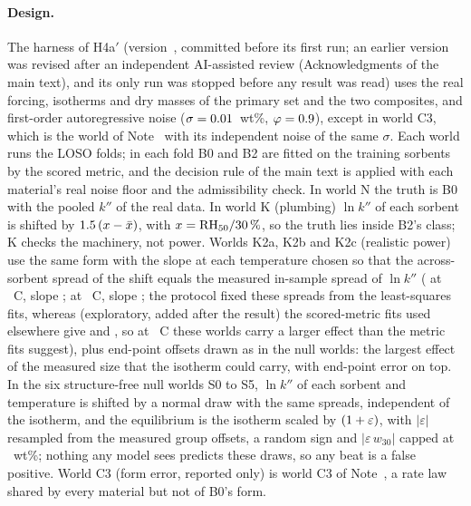 \documentclass[11pt]{article}
\newcommand{\kpp}{k''}
\begin{document}
\paragraph{Design.} The harness of H4a$'$ (version~, committed before its first run; an earlier version was
revised after an independent AI-assisted review (Acknowledgments of the main text), and its only run was stopped before any result was read) uses the real forcing,
isotherms and dry masses of the primary set and the two composites, and first-order autoregressive
noise ($\sigma = \V{si2_sig}{0.01}$~wt\%, $\varphi = \V{si2_phi}{0.9}$), except in world C3, which is the world of
Note~ with its independent noise of the same $\sigma$. Each world runs the  LOSO folds; in each fold B0 and B2 are fitted on the training
sorbents by the scored metric, and the decision rule of the main text is applied with each material's real noise
floor and the admissibility check. In world N the truth is B0 with the pooled $\kpp$ of the real data. In world K
(plumbing) $\ln\kpp$ of each sorbent is shifted by $\V{si2_bK}{1.5}\,(x - \bar{x})$, with $x = \mathrm{RH}_{50}/\V{si2_x30}{30}\,\%$,
so the truth lies inside B2's class; K checks the machinery, not power. Worlds K2a, K2b and K2c (realistic power) use
the same form with the slope at each temperature chosen so that the across-sorbent spread of the shift equals the
measured in-sample spread of $\ln\kpp$ ( at ~\textdegree C, slope
;  at ~\textdegree C, slope ; the protocol fixed
these spreads from the least-squares fits, whereas (exploratory, added after the result) the scored-metric fits used elsewhere give  and
, so at ~\textdegree C these worlds carry a larger effect than the metric fits suggest), plus
end-point
offsets drawn as in the null worlds: the largest effect of the measured size that the isotherm could carry, with
end-point error on top. In the six structure-free null worlds S0 to S5, $\ln\kpp$ of each sorbent and
temperature is shifted by a normal draw with the same spreads, independent of the isotherm, and the equilibrium is the
isotherm scaled by $(\C{1} + \varepsilon)$, with $|\varepsilon|$ resampled from the  measured group
offsets, a random sign and $|\varepsilon\, w_{30}|$ capped at ~wt\%; nothing any model sees predicts
these draws, so any beat is a false positive. World C3 (form error, reported only) is world C3 of Note~, a
rate law shared by every material but not of B0's form.
\end{document}
